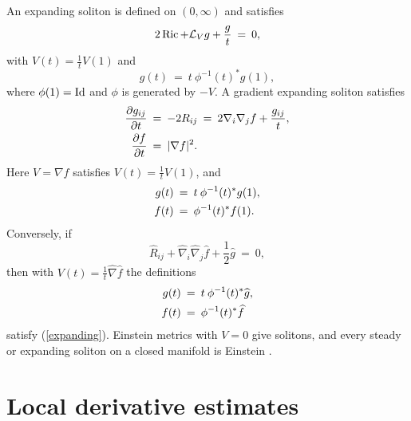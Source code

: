 An expanding soliton is defined on $(0,\infty)$ and satisfies
\begin{equation}
2\operatorname{Ric}+{\mathcal L}_Vg+\frac gt\:=\:0,
\end{equation}
with $V(t)=\frac1tV(1)$ and
\begin{equation}
g(t)\:=\:t\:\phi^{-1}(t)^*g(1),
\end{equation}
where $\phi(1)=\operatorname{Id}$ and $\phi$ is generated by $-V$.
A gradient expanding soliton satisfies
\begin{align} \label{expanding}
\frac{\partial g_{ij}}{\partial t}\: & = \:-2R_{ij}\:=\:
2\nabla_i\nabla_jf+\frac{g_{ij}}t,\\
\frac{\partial f}{\partial t}\: & = \:|\nabla f|^2. \notag
\end{align}
Here $V=\nabla f$ satisfies $V(t)=\frac1tV(1)$, and
\begin{align} \label{expandingsoln}
g(t)\: & = \:t\:\phi^{-1}(t)^*g(1),\\
f(t)\: & = \:\phi^{-1}(t)^*f(1). \notag
\end{align}
Conversely, if
\begin{equation}
\widehat R_{ij}+\widehat\nabla_i\widehat\nabla_j\widehat f
+\frac12\widehat g\:=\:0,
\end{equation}
then with $V(t)=\frac1t\widehat\nabla\widehat f$ the definitions
\begin{align}
g(t)\: & = \:t\:\phi^{-1}(t)^*\widehat g,\\
f(t)\: & = \:\phi^{-1}(t)^*\widehat f \notag
\end{align}
satisfy (\ref{expanding}). Einstein metrics with $V=0$ give solitons, and
every steady or expanding soliton on a closed manifold is Einstein
\cite[Chapter 2]{Chow-Knopf}.

\section{Local derivative estimates} \label{applocalder}

